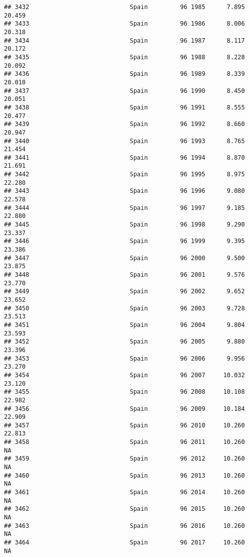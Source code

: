 \documentclass[
]{article}
\begin{document}
\begin{verbatim}
## 3432                            Spain         96 1985      7.895     20.459
## 3433                            Spain         96 1986      8.006     20.318
## 3434                            Spain         96 1987      8.117     20.172
## 3435                            Spain         96 1988      8.228     20.092
## 3436                            Spain         96 1989      8.339     20.010
## 3437                            Spain         96 1990      8.450     20.051
## 3438                            Spain         96 1991      8.555     20.477
## 3439                            Spain         96 1992      8.660     20.947
## 3440                            Spain         96 1993      8.765     21.454
## 3441                            Spain         96 1994      8.870     21.691
## 3442                            Spain         96 1995      8.975     22.280
## 3443                            Spain         96 1996      9.080     22.578
## 3444                            Spain         96 1997      9.185     22.880
## 3445                            Spain         96 1998      9.290     23.337
## 3446                            Spain         96 1999      9.395     23.386
## 3447                            Spain         96 2000      9.500     23.875
## 3448                            Spain         96 2001      9.576     23.770
## 3449                            Spain         96 2002      9.652     23.652
## 3450                            Spain         96 2003      9.728     23.513
## 3451                            Spain         96 2004      9.804     23.593
## 3452                            Spain         96 2005      9.880     23.396
## 3453                            Spain         96 2006      9.956     23.270
## 3454                            Spain         96 2007     10.032     23.120
## 3455                            Spain         96 2008     10.108     22.982
## 3456                            Spain         96 2009     10.184     22.909
## 3457                            Spain         96 2010     10.260     22.813
## 3458                            Spain         96 2011     10.260         NA
## 3459                            Spain         96 2012     10.260         NA
## 3460                            Spain         96 2013     10.260         NA
## 3461                            Spain         96 2014     10.260         NA
## 3462                            Spain         96 2015     10.260         NA
## 3463                            Spain         96 2016     10.260         NA
## 3464                            Spain         96 2017     10.260         NA

\end{verbatim}
\end{document}
